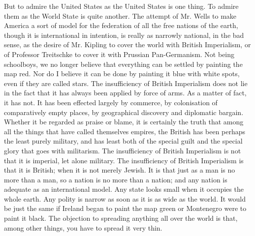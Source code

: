 \documentclass{book}
\begin{document}
But to admire the United States as the United States is one thing. To admire them as the World State is quite another. The attempt of Mr. Wells to make America a sort of model for the federation of all the free nations of the earth, though it is international in intention, is really as narrowly national, in the bad sense, as the desire of Mr. Kipling to cover the world with British Imperialism, or of Professor Treitschke to cover it with Prussian Pan-Germanism. Not being schoolboys, we no longer believe that everything can be settled by painting the map red. Nor do I believe it can be done by painting it blue with white spots, even if they are called stars. The insufficiency of British Imperialism does not lie in the fact that it has always been applied by force of arms. As a matter of fact, it has not. It has been effected largely by commerce, by colonisation of comparatively empty places, by geographical discovery and diplomatic bargain. Whether it be regarded as praise or blame, it is certainly the truth that among all the things that have called themselves empires, the British has been perhaps the least purely military, and has least both of the special guilt and the special glory that goes with militarism. The insufficiency of British Imperialism is not that it is imperial, let alone military. The insufficiency of British Imperialism is that it is British; when it is not merely Jewish. It is that just as a man is no more than a man, so a nation is no more than a nation; and any nation is adequate as an international model. Any state looks small when it occupies the whole earth. Any polity is narrow as soon as it is as wide as the world. It would be just the same if Ireland began to paint the map green or Montenegro were to paint it black. The objection to spreading anything all over the world is that, among other things, you have to spread it very thin.
\end{document}
